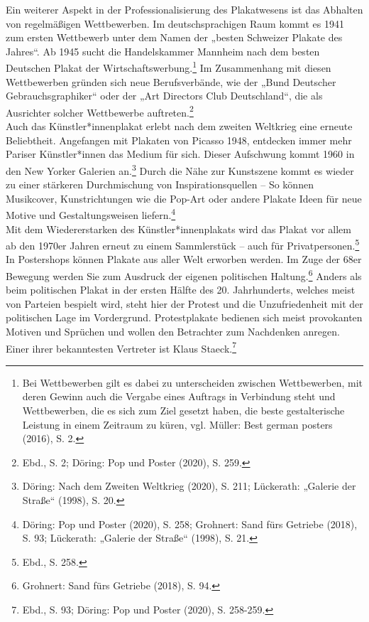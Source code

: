 \documentclass[a4paper,12pt,ngerman]{article}
\begin{document}
Ein weiterer Aspekt in der Professionalisierung des Plakatwesens ist das Abhalten von regelmäßigen Wettbewerben. Im deutschsprachigen Raum kommt es 1941 zum ersten Wettbewerb unter dem Namen der „besten Schweizer Plakate des Jahres“. Ab 1945 sucht die Handelskammer Mannheim nach dem besten Deutschen Plakat der Wirtschaftswerbung.\footnote{Bei Wettbewerben gilt es dabei zu unterscheiden zwischen Wettbewerben, mit deren Gewinn auch die Vergabe eines Auftrags in Verbindung steht und Wettbewerben, die es sich zum Ziel gesetzt haben, die beste gestalterische Leistung in einem Zeitraum zu küren, vgl. Müller: Best german posters (2016), S. 2.}  Im Zusammenhang mit diesen Wettbewerben gründen sich neue Berufsverbände, wie der „Bund Deutscher Gebrauchsgraphiker“ oder der „Art Directors Club Deutschland“, die als Ausrichter solcher Wettbewerbe auftreten.\footnote{Ebd., S. 2; Döring: Pop und Poster (2020), S. 259.} \\
Auch das Künstler*innenplakat erlebt nach dem zweiten Weltkrieg eine erneute Beliebtheit. Angefangen mit Plakaten von Picasso 1948, entdecken immer mehr Pariser Künstler*innen das Medium für sich. Dieser Aufschwung kommt 1960 in den New Yorker Galerien an.\footnote{Döring: Nach dem Zweiten Weltkrieg (2020), S. 211; Lückerath: „Galerie der Straße“ (1998), S. 20.}  Durch die Nähe zur Kunstszene kommt es wieder zu einer stärkeren Durchmischung von Inspirationsquellen -- So können Musikcover, Kunstrichtungen wie die Pop-Art oder andere Plakate Ideen für neue Motive und Gestaltungsweisen liefern.\footnote{Döring: Pop und Poster (2020), S. 258; Grohnert: Sand fürs Getriebe (2018), S. 93; Lückerath: „Galerie der Straße“ (1998), S. 21.} \\
Mit dem Wiedererstarken des Künstler*innenplakats wird das Plakat vor allem ab den 1970er Jahren erneut zu einem Sammlerstück -- auch für Privatpersonen.\footnote{Ebd., S. 258.}  In Postershops können Plakate aus aller Welt erworben werden. Im Zuge der 68er Bewegung werden Sie zum Ausdruck der eigenen politischen Haltung.\footnote{Grohnert: Sand fürs Getriebe (2018), S. 94.}  Anders als beim politischen Plakat in der ersten Hälfte des 20. Jahrhunderts, welches meist von Parteien bespielt wird, steht hier der Protest und die Unzufriedenheit mit der politischen Lage im Vordergrund. Protestplakate bedienen sich meist provokanten Motiven und Sprüchen und wollen den Betrachter zum Nachdenken anregen. Einer ihrer bekanntesten Vertreter ist Klaus Staeck.\footnote{Ebd., S. 93; Döring: Pop und Poster (2020), S. 258-259.} \\
\end{document}
